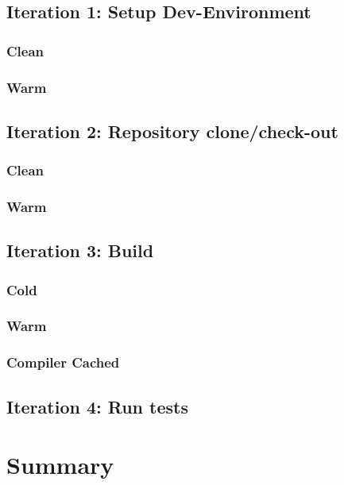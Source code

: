 \subsection{Iteration 1: Setup Dev-Environment}
\subsubsection{Clean}
\subsubsection{Warm}
\subsection{Iteration 2: Repository clone/check-out}
\subsubsection{Clean}
\subsubsection{Warm}
\subsection{Iteration 3: Build}
\subsubsection{Cold}
\subsubsection{Warm}
\subsubsection{Compiler Cached}
\subsection{Iteration 4: Run tests}


\section{Summary}
